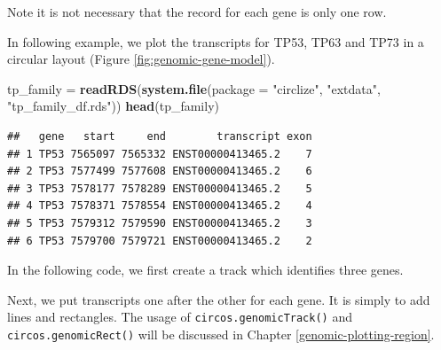 \documentclass[]{book}
\newenvironment{Shaded}{\begin{snugshade}}{\end{snugshade}}
\newcommand{\KeywordTok}[1]{\textcolor[rgb]{0.13,0.29,0.53}{\textbf{#1}}}
\newcommand{\DataTypeTok}[1]{\textcolor[rgb]{0.13,0.29,0.53}{#1}}
\newcommand{\DecValTok}[1]{\textcolor[rgb]{0.00,0.00,0.81}{#1}}
\newcommand{\FloatTok}[1]{\textcolor[rgb]{0.00,0.00,0.81}{#1}}
\newcommand{\StringTok}[1]{\textcolor[rgb]{0.31,0.60,0.02}{#1}}
\newcommand{\OtherTok}[1]{\textcolor[rgb]{0.56,0.35,0.01}{#1}}
\newcommand{\NormalTok}[1]{#1}
\begin{document}
Note it is not necessary that the record for each gene is only one row.

In following example, we plot the transcripts for TP53, TP63 and TP73 in
a circular layout (Figure \ref{fig:genomic-gene-model}).

\begin{Shaded}
\begin{Highlighting}[]
\NormalTok{tp_family =}\StringTok{ }\KeywordTok{readRDS}\NormalTok{(}\KeywordTok{system.file}\NormalTok{(}\DataTypeTok{package =} \StringTok{"circlize"}\NormalTok{, }\StringTok{"extdata"}\NormalTok{, }\StringTok{"tp_family_df.rds"}\NormalTok{))}
\KeywordTok{head}\NormalTok{(tp_family)}
\end{Highlighting}
\end{Shaded}

\begin{verbatim}
##   gene   start     end        transcript exon
## 1 TP53 7565097 7565332 ENST00000413465.2    7
## 2 TP53 7577499 7577608 ENST00000413465.2    6
## 3 TP53 7578177 7578289 ENST00000413465.2    5
## 4 TP53 7578371 7578554 ENST00000413465.2    4
## 5 TP53 7579312 7579590 ENST00000413465.2    3
## 6 TP53 7579700 7579721 ENST00000413465.2    2
\end{verbatim}

In the following code, we first create a track which identifies three
genes.

\begin{Shaded}
\end{Shaded}

Next, we put transcripts one after the other for each gene. It is simply
to add lines and rectangles. The usage of \texttt{circos.genomicTrack()}
and \texttt{circos.genomicRect()} will be discussed in Chapter
\ref{genomic-plotting-region}.
\end{document}
